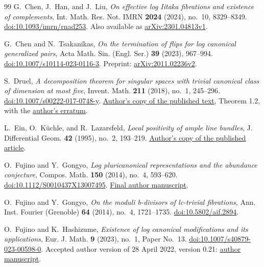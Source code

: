 \begin{thebibliography}{99}
G.~Chen, J.~Han, and J.~Liu,
\emph{On effective log Iitaka fibrations and existence of complements},
Int. Math. Res. Not. IMRN \textbf{2024} (2024), no.~10, 8329--8349.
\href{https://doi.org/10.1093/imrn/rnad253}{doi:10.1093/imrn/rnad253}.
Also available as \href{https://arxiv.org/abs/2301.04813v1}{arXiv:2301.04813v1}.

G.~Chen and N.~Tsakanikas,
\emph{On the termination of flips for log canonical generalized pairs},
Acta Math. Sin. (Engl. Ser.) \textbf{39} (2023), 967--994.
\href{https://doi.org/10.1007/s10114-023-0116-3}{doi:10.1007/s10114-023-0116-3}.
Preprint: \href{https://arxiv.org/abs/2011.02236v2}{arXiv:2011.02236v2}.

S.~Druel, \emph{A decomposition theorem for singular spaces with trivial
canonical class of dimension at most five}, Invent. Math. \textbf{211}
(2018), no.~1, 245--296.
\href{https://doi.org/10.1007/s00222-017-0748-y}{doi:10.1007/s00222-017-0748-y}.
\href{https://druel.perso.math.cnrs.fr/textes/bobo.pdf}{Author's copy of the published text},
Theorem 1.2, with the
\href{https://druel.perso.math.cnrs.fr/textes/bobo_erratum.pdf}{author's erratum}.

L.~Ein, O.~K\"uchle, and R.~Lazarsfeld,
\emph{Local positivity of ample line bundles},
J. Differential Geom. \textbf{42} (1995), no.~2, 193--219.
\href{https://www.math.stonybrook.edu/~roblaz/Reprints/Ein.Kuchle.Laz.LPALB.pdf}{Author's copy of the published article}.

O.~Fujino and Y.~Gongyo,
\emph{Log pluricanonical representations and the abundance conjecture},
Compos. Math. \textbf{150} (2014), no.~4, 593--620.
\href{https://doi.org/10.1112/S0010437X13007495}{doi:10.1112/S0010437X13007495}.
\href{https://www.math.kyoto-u.ac.jp/~fujino/fg-comp-final.pdf}{Final author manuscript}.

O.~Fujino and Y.~Gongyo,
\emph{On the moduli b-divisors of lc-trivial fibrations},
Ann. Inst. Fourier (Grenoble) \textbf{64} (2014), no.~4, 1721--1735.
\href{https://doi.org/10.5802/aif.2894}{doi:10.5802/aif.2894}.

O.~Fujino and K.~Hashizume,
\emph{Existence of log canonical modifications and its applications},
Eur. J. Math. \textbf{9} (2023), no.~1, Paper No.~13.
\href{https://doi.org/10.1007/s40879-023-00598-0}{doi:10.1007/s40879-023-00598-0}.
Accepted author version of 28 April 2022, version 0.21:
\href{https://www.math.kyoto-u.ac.jp/~fujino/lc-model-fujino-hashizume-draft-7-EJM-rev-normalstylefile.pdf}{author manuscript}.


\end{thebibliography}
